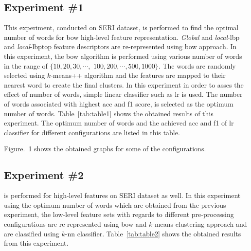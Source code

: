 \subsection{Experiment \#1}
This experiment, conducted on SERI dataset, is performed to find the optimal number of words for \ac{bow} high-level feature representation.
\emph{Global} and \emph{local}-\ac{lbp} and \emph{local}-\ac{lbptop} feature descriptors are re-represented using \ac{bow} approach.
In this experiment, the \ac{bow} algorithm is performed using various number of words in the range of $\{10, 20, 30, \cdots,$
 $100, 200, \cdots, 500, 1000\}$.
The words are randomly selected using $k$-means++ algorithm and the features are mapped to their nearest word to create the final clusters.
In this experiment in order to asses the effect of number of words, simple linear classifier such as \ac{lr} is used.
The number of words associated with highest \ac{acc} and \ac{f1} score, is selected as the optimum number of words.
Table~\ref{tab:table1} shows the obtained results of this experiment.
The optimum number of words and the achieved \ac{acc} and \ac{f1} of \ac{lr} classifier for different configurations are listed in this table.




Figure.~\ref{fig:RBOW} shows the obtained graphs for some of the configurations. \\

\begin{figure}[t]
  \caption{}
  \label{fig:RBOW}
\end{figure}
 
\subsection{Experiment \#2}
 is performed for high-level features on SERI dataset as well. 
In this experiment using the optimum number of words which are obtained from the previous experiment, the low-level feature sets with regards to different pre-processing configurations are re-represented using \ac{bow} and $k$-means clustering approach and are classified using $k$-\ac{nn} classifier.
Table~\ref{tab:table2} shows the obtained results from this experiment.\\



